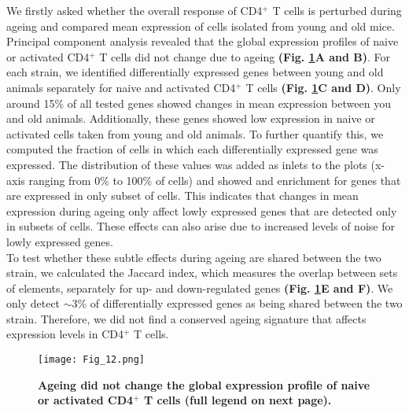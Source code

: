 We firstly asked whether the overall response of CD4$^+$ T cells is perturbed during ageing and compared mean expression of cells isolated from young and old mice. Principal component analysis revealed that the global expression profiles of naive or activated CD4$^+$ T cells did not change due to ageing \textbf{(Fig. \ref{fig1:mean_expression_ageing}A and B)}. For each strain, we identified differentially expressed genes between young and old animals separately for naive and activated CD4$^+$ T cells \textbf{(Fig. \ref{fig1:mean_expression_ageing}C and D)}. Only around 15\% of all tested genes showed changes in mean expression between you and old animals. Additionally, these genes showed low expression in naive or activated cells taken from young and old animals. To further quantify this, we computed the fraction of cells in which each differentially expressed gene was expressed. The distribution of these values was added as inlets to the plots (x-axis ranging from 0\% to 100\% of cells) and showed and enrichment for genes that are expressed in only subset of cells. This indicates that changes in mean expression during ageing only affect lowly expressed genes that are detected only in subsets of cells. These effects can also arise due to increased levels of noise for lowly expressed genes. \\

To test whether these subtle effects during ageing are shared between the two strain, we calculated the Jaccard index, which measures the overlap between sets of elements, separately for up- and down-regulated genes \textbf{(Fig. \ref{fig1:mean_expression_ageing}E and F)}. We only detect $\sim$3\% of differentially expressed genes as being shared between the two strain. Therefore, we did not find a conserved ageing signature that affects expression levels in CD4$^+$ T cells.

\newpage

\begin{figure}[!ht]
\centering
\texttt{[image: Fig\_12.png]}
\caption[Global immune response during ageing]{\textbf{Ageing did not change the global expression profile of naive or activated CD4$^+$ T cells (full legend on next page).}}
\label{fig1:mean_expression_ageing}
\end{figure}

\newpage

